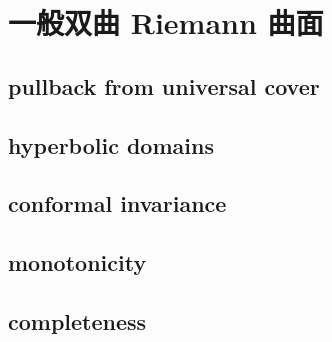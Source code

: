 \section{一般双曲 Riemann 曲面}
\label{b3:sec:1304}


\subsection{pullback from universal cover}
\label{b3:subsec:130401}

\subsection{hyperbolic domains}
\label{b3:subsec:130402}

\subsection{conformal invariance}
\label{b3:subsec:130403}

\subsection{monotonicity}
\label{b3:subsec:130404}

\subsection{completeness}
\label{b3:subsec:130405}


